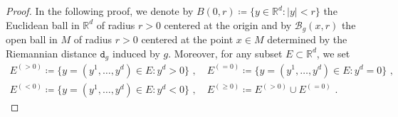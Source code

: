\documentclass[10pt, a4paper, reqno, oneside]{amsart}
\theoremstyle{plain}
\theoremstyle{definition}
\theoremstyle{plain}
\theoremstyle{definition}
\theoremstyle{plain}
\renewcommand{\=}{:=}
\begin{document}
\begin{proof}
In the following proof, we denote by $B(0,r) \coloneqq \{y \in \mathbb{R}^d : |y|<r \big\}$ the Euclidean ball in $\mathbb{R}^d$ of radius $r>0$ centered at the origin and by $\mathscr{B}_g(x,r)$ the open ball in $M$ of radius $r>0$ centered at the point $x \in M$ determined by the Riemannian distance $\mathtt{d}_g$ induced by $g$. Moreover, for any subset $E \subset \mathbb{R}^d$, we set
$$\begin{gathered}
E^{(>0)} \coloneqq \big\{y = (y^1,{\dots},y^d) \in E : y^d>0\big\} \,\, , \quad
E^{(=0)} \coloneqq \big\{y = (y^1,{\dots},y^d) \in E : y^d=0\big\} \,\, , \\
E^{(<0)} \coloneqq \big\{y = (y^1,{\dots},y^d) \in E : y^d<0\big\} \,\, , \quad 
E^{(\geq 0)} \coloneqq E^{(>0)} \cup E^{(=0)} \,\, .
\end{gathered}$$


\end{proof}
\end{document}
